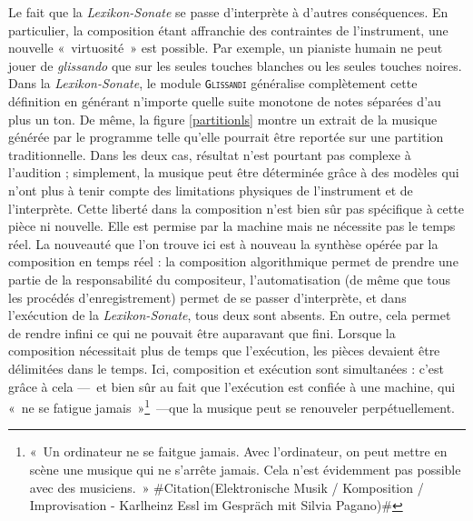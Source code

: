 \documentclass[a4paper,12pt]{article}
\newcommand{\guill}[1]{«~#1~»}
\newcommand{\zitat}[2]{\#Citation(#2)\#}
\begin{document}
Le fait que la \emph{Lexikon-Sonate} se passe d'interprète à d'autres conséquences. En particulier, la composition étant affranchie des contraintes de l'instrument, une nouvelle \guill{virtuosité} est possible. Par exemple, un pianiste humain ne peut jouer de \emph{glissando} que sur les seules touches blanches ou les seules touches noires. Dans la \emph{Lexikon-Sonate}, le module \texttt{\textsc{Glissandi}} généralise complètement cette définition en générant n'importe quelle suite monotone de notes séparées d'au plus un ton. De même, la figure \ref{partitionls} montre un extrait de la musique générée par le programme telle qu'elle pourrait être reportée sur une partition traditionnelle. Dans les deux cas, résultat n'est pourtant pas complexe à l'audition ; simplement, la musique peut être déterminée grâce à des modèles qui n'ont plus à tenir compte des limitations physiques de l'instrument et de l'interprète. Cette liberté dans la composition n'est bien sûr pas spécifique à cette pièce ni nouvelle. Elle est permise par la machine mais ne nécessite pas le temps réel. La nouveauté que l'on trouve ici est à nouveau la synthèse opérée par la composition en temps réel : la composition algorithmique permet de prendre une partie de la responsabilité du compositeur, l'automatisation (de même que tous les procédés d'enregistrement) permet de se passer d'interprète, et dans l'exécution de la \emph{Lexikon-Sonate}, tous deux sont absents. En outre, cela permet de rendre infini ce qui ne pouvait être auparavant que fini. Lorsque la composition nécessitait plus de temps que l'exécution, les pièces devaient être délimitées dans le temps. Ici, composition et exécution sont simultanées : c'est grâce à cela ---~et bien sûr au fait que l'exécution est confiée à une machine, qui \guill{ne se fatigue jamais}\footnote{\guill{Un ordinateur ne se faitgue jamais. Avec l'ordinateur, on peut mettre en scène une musique qui ne s'arrête jamais. Cela n'est évidemment pas possible avec des musiciens.}
\zitat{Ein Computer wird nie müde. Mit dem Computer kann man eine Musik in Szene setzen, die nie aufhört, das geht mit Musikern natürlich nicht.}
{Elektronische Musik / Komposition / Improvisation - Karlheinz Essl im Gespräch mit Silvia Pagano}}~---que la musique peut se renouveler perpétuellement.
\end{document}
